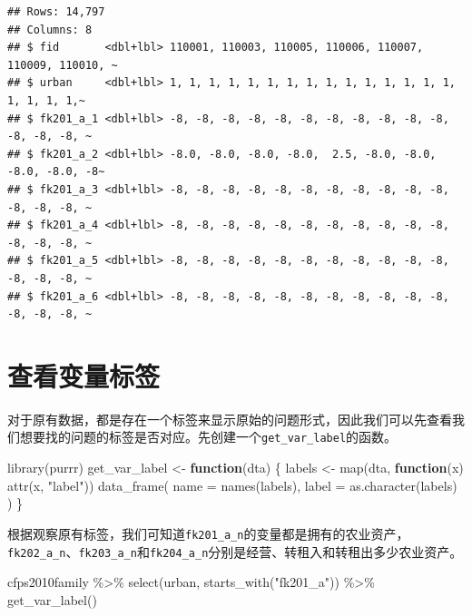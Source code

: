 \documentclass[
  oneside]{book}
\newenvironment{Shaded}{\begin{snugshade}}{\end{snugshade}}
\newcommand{\AttributeTok}[1]{\textcolor[rgb]{0.77,0.63,0.00}{#1}}
\newcommand{\ControlFlowTok}[1]{\textcolor[rgb]{0.13,0.29,0.53}{\textbf{#1}}}
\newcommand{\FunctionTok}[1]{\textcolor[rgb]{0.00,0.00,0.00}{#1}}
\newcommand{\NormalTok}[1]{#1}
\newcommand{\OtherTok}[1]{\textcolor[rgb]{0.56,0.35,0.01}{#1}}
\newcommand{\SpecialCharTok}[1]{\textcolor[rgb]{0.00,0.00,0.00}{#1}}
\newcommand{\StringTok}[1]{\textcolor[rgb]{0.31,0.60,0.02}{#1}}
\begin{document}
\begin{verbatim}
## Rows: 14,797
## Columns: 8
## $ fid       <dbl+lbl> 110001, 110003, 110005, 110006, 110007, 110009, 110010, ~
## $ urban     <dbl+lbl> 1, 1, 1, 1, 1, 1, 1, 1, 1, 1, 1, 1, 1, 1, 1, 1, 1, 1, 1,~
## $ fk201_a_1 <dbl+lbl> -8, -8, -8, -8, -8, -8, -8, -8, -8, -8, -8, -8, -8, -8, ~
## $ fk201_a_2 <dbl+lbl> -8.0, -8.0, -8.0, -8.0,  2.5, -8.0, -8.0, -8.0, -8.0, -8~
## $ fk201_a_3 <dbl+lbl> -8, -8, -8, -8, -8, -8, -8, -8, -8, -8, -8, -8, -8, -8, ~
## $ fk201_a_4 <dbl+lbl> -8, -8, -8, -8, -8, -8, -8, -8, -8, -8, -8, -8, -8, -8, ~
## $ fk201_a_5 <dbl+lbl> -8, -8, -8, -8, -8, -8, -8, -8, -8, -8, -8, -8, -8, -8, ~
## $ fk201_a_6 <dbl+lbl> -8, -8, -8, -8, -8, -8, -8, -8, -8, -8, -8, -8, -8, -8, ~
\end{verbatim}

\hypertarget{ux67e5ux770bux53d8ux91cfux6807ux7b7e}{%
\section{查看变量标签}\label{ux67e5ux770bux53d8ux91cfux6807ux7b7e}}

对于原有数据，都是存在一个标签来显示原始的问题形式，因此我们可以先查看我们想要找的问题的标签是否对应。先创建一个\texttt{get\_var\_label}的函数。

\begin{Shaded}
\begin{Highlighting}[]
\FunctionTok{library}\NormalTok{(purrr)}
\NormalTok{get\_var\_label }\OtherTok{\textless{}{-}} \ControlFlowTok{function}\NormalTok{(dta) \{}
\NormalTok{  labels }\OtherTok{\textless{}{-}} \FunctionTok{map}\NormalTok{(dta, }\ControlFlowTok{function}\NormalTok{(x) }\FunctionTok{attr}\NormalTok{(x, }\StringTok{"label"}\NormalTok{))}
  \FunctionTok{data\_frame}\NormalTok{(}
    \AttributeTok{name =} \FunctionTok{names}\NormalTok{(labels),}
    \AttributeTok{label =} \FunctionTok{as.character}\NormalTok{(labels)}
\NormalTok{  )}
\NormalTok{\}}
\end{Highlighting}
\end{Shaded}

根据观察原有标签，我们可知道\texttt{fk201\_a\_n}的变量都是拥有的农业资产，\texttt{fk202\_a\_n}、\texttt{fk203\_a\_n}和\texttt{fk204\_a\_n}分别是经营、转租入和转租出多少农业资产。

\begin{Shaded}
\begin{Highlighting}[]
\NormalTok{cfps2010family }\SpecialCharTok{\%\textgreater{}\%}
  \FunctionTok{select}\NormalTok{(urban, }\FunctionTok{starts\_with}\NormalTok{(}\StringTok{"fk201\_a"}\NormalTok{)) }\SpecialCharTok{\%\textgreater{}\%}
  \FunctionTok{get\_var\_label}\NormalTok{()}
\end{Highlighting}
\end{Shaded}
\end{document}
